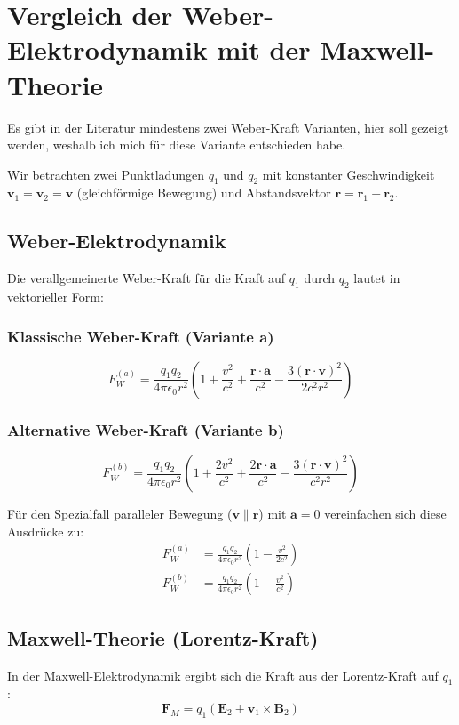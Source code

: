 \newpage
\section{Vergleich der Weber-Elektrodynamik mit der Maxwell-Theorie}
Es gibt in der Literatur mindestens zwei Weber-Kraft Varianten, hier soll gezeigt werden, weshalb ich mich für diese Variante entschieden habe.

Wir betrachten zwei Punktladungen $q_1$ und $q_2$ mit konstanter Geschwindigkeit $\mathbf{v}_1 = \mathbf{v}_2 = \mathbf{v}$ (gleichförmige Bewegung) und Abstandsvektor $\mathbf{r} = \mathbf{r}_1 - \mathbf{r}_2$.

\subsection{Weber-Elektrodynamik}
Die verallgemeinerte Weber-Kraft für die Kraft auf $q_1$ durch $q_2$ lautet in vektorieller Form:

\subsubsection{Klassische Weber-Kraft (Variante a)}
\begin{equation}
F_W^{(a)} = \frac{q_1 q_2}{4 \pi \epsilon_0 r^2} \left(1 + \frac{v^2}{c^2} + \frac{\mathbf{r} \cdot \mathbf{a}}{c^2} - \frac{3 (\mathbf{r} \cdot \mathbf{v})^2}{2 c^2 r^2}\right)
\end{equation}

\subsubsection{Alternative Weber-Kraft (Variante b)}
\begin{equation}
F_W^{(b)} = \frac{q_1 q_2}{4 \pi \epsilon_0 r^2} \left(1 + \frac{2 v^2}{c^2} + \frac{2 \mathbf{r} \cdot \mathbf{a}}{c^2} - \frac{3 (\mathbf{r} \cdot \mathbf{v})^2}{c^2 r^2}\right)
\end{equation}

Für den Spezialfall paralleler Bewegung ($\mathbf{v} \parallel \mathbf{r}$) mit $\mathbf{a} = 0$ vereinfachen sich diese Ausdrücke zu:
\begin{align}
F_W^{(a)} &= \frac{q_1 q_2}{4 \pi \epsilon_0 r^2} \left(1 - \frac{v^2}{2 c^2}\right) \\
F_W^{(b)} &= \frac{q_1 q_2}{4 \pi \epsilon_0 r^2} \left(1 - \frac{v^2}{c^2}\right)
\end{align}

\subsection{Maxwell-Theorie (Lorentz-Kraft)}
In der Maxwell-Elektrodynamik ergibt sich die Kraft aus der Lorentz-Kraft auf $q_1$:
\begin{equation}
\mathbf{F}_M = q_1 (\mathbf{E}_2 + \mathbf{v}_1 \times \mathbf{B}_2)
\end{equation}

